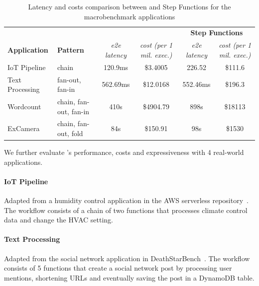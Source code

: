 \begin{table}[t]
\centering
\begin{tabular}{ll|cc|cc}
\hline
                     &                        & \multicolumn{2}{c}{\textbf{\name{}}}            & \multicolumn{2}{c}{\textbf{Step Functions}}       \\
\textbf{Application} & \textbf{Pattern}       & \textit{e2e latency} & \textit{cost (per 1 mil. exec.)}   & \textit{e2e latency} & \textit{cost (per 1 mil. exec.)}            \\ \hline
IoT Pipeline         & chain                  & 120.9ms              & \$3.4005      & 226.52       & \$111.6    \\
Text Processing      & fan-out, fan-in        & 562.69ms             & \$12.0168      & 552.46ms             & \$196.3                                                                           \\
Wordcount            & chain, fan-out, fan-in & 410s                 & \$4904.79   & 898s                 & \$18113 \\
ExCamera             & chain, fan-out, fold   & 84s                  & \$150.91 & 98s                  & \$1530      \\ \hline
\end{tabular}
\caption{Latency and costs comparison between \name{} and Step Functions for the macrobenchmark applications}
\label{table:macro}
\end{table}

We further evaluate \name{}'s performance, costs and expressiveness with 4
real-world applications. 

\paragraph{IoT Pipeline} Adapted from a humidity control application in the
AWS serverless repository~\cite{iot-pipeline}. The workflow consists of a
chain of two functions that processes climate control data and change the HVAC
setting.

\paragraph{Text Processing} Adapted from the social network application in
DeathStarBench~\cite{deathstar}. The workflow consists of 5 functions that
create a social network post by processing user mentions, shortening URLs and
eventually saving the post in a DynamoDB table.

